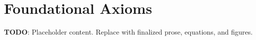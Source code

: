 
\section{Foundational Axioms}
\label{sec:foundational-axioms}

\textbf{TODO}: Placeholder content. Replace with finalized prose, equations, and figures.

